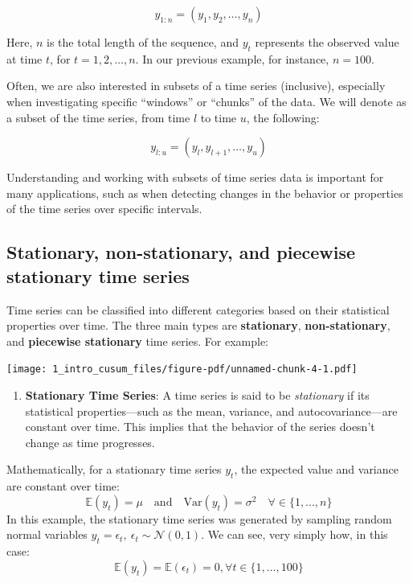 \documentclass[
  letterpaper,
  DIV=11,
  numbers=noendperiod]{scrreprt}
\providecommand{\tightlist}{%
  \setlength{\itemsep}{0pt}\setlength{\parskip}{0pt}}\usepackage{longtable,booktabs,array}
\begin{document}
\[
  y_{1:n} = (y_1, y_2, \dots, y_n)
\]

Here, \(n\) is the total length of the sequence, and \(y_t\) represents
the observed value at time \(t\), for \(t = 1, 2, \dots, n\). In our
previous example, for instance, \(n = 100\).

Often, we are also interested in subsets of a time series (inclusive),
especially when investigating specific ``windows'' or ``chunks'' of the
data. We will denote as a subset of the time series, from time \(l\) to
time \(u\), the following:

\[
  y_{l:u} = (y_l, y_{l+1}, \dots, y_u)
\]

Understanding and working with subsets of time series data is important
for many applications, such as when detecting changes in the behavior or
properties of the time series over specific intervals.

\subsection{Stationary, non-stationary, and piecewise stationary time
series}\label{stationary-non-stationary-and-piecewise-stationary-time-series}

Time series can be classified into different categories based on their
statistical properties over time. The three main types are
\textbf{stationary}, \textbf{non-stationary}, and \textbf{piecewise
stationary} time series. For example:

\texttt{[image: 1\_intro\_cusum\_files/figure-pdf/unnamed-chunk-4-1.pdf]}

\begin{enumerate}
\def\labelenumi{\arabic{enumi}.}
\tightlist
\item
  \textbf{Stationary Time Series}: A time series is said to be
  \emph{stationary} if its statistical properties---such as the mean,
  variance, and autocovariance---are constant over time. This implies
  that the behavior of the series doesn't change as time progresses.
\end{enumerate}

Mathematically, for a stationary time series \(y_t\), the expected value
and variance are constant over time: \[
    \mathbb{E}(y_t) = \mu \quad \text{and} \quad \text{Var}(y_t) = \sigma^2 \quad \forall \in \{1, ..., n\}
\] In this example, the stationary time series was generated by sampling
random normal variables
\(y_t = \epsilon_t, \ \epsilon_t \sim \mathcal{N}(0, 1)\). We can see,
very simply how, in this case: \[
    \mathbb{E}(y_t) = \mathbb{E}(\epsilon_t) = 0, \forall t \in \{1, ..., 100\}
\]
\end{document}

